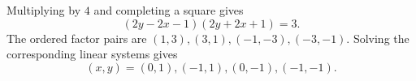 Multiplying by $4$ and completing a square gives
\[
(2y-2x-1)(2y+2x+1)=3.
\]
The ordered factor pairs are $(1,3),(3,1),(-1,-3),(-3,-1)$. Solving the corresponding linear systems gives
\[
\boxed{(x,y)=(0,1),(-1,1),(0,-1),(-1,-1)}.
\]
